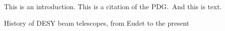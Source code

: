  
This is an introduction.
This is a citation of the PDG.\,\cite{PhysRevD.86.010001}
And this is text.


History of DESY beam telescopes, from Eudet to the present
